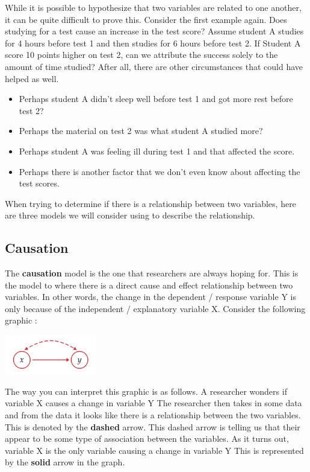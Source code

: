\documentclass[
  letterpaper,
  DIV=11,
  numbers=noendperiod]{scrreprt}
\providecommand{\tightlist}{%
  \setlength{\itemsep}{0pt}\setlength{\parskip}{0pt}}\usepackage{longtable,booktabs,array}
\begin{document}
While it is possible to hypothesize that two variables are related to
one another, it can be quite difficult to prove this. Consider the first
example again. Does studying for a test cause an increase in the test
score? Assume student A studies for 4 hours before test 1 and then
studies for 6 hours before test 2. If Student A score 10 points higher
on test 2, can we attribute the success solely to the amount of time
studied? After all, there are other circumstances that could have helped
as well.

\begin{itemize}
\tightlist
\item
  Perhaps student A didn't sleep well before test 1 and got more rest
  before test 2?
\item
  Perhaps the material on test 2 was what student A studied more?
\item
  Perhaps student A was feeling ill during test 1 and that affected the
  score.
\item
  Perhaps there is another factor that we don't even know about
  affecting the test scores.
\end{itemize}

When trying to determine if there is a relationship between two
variables, here are three models we will consider using to describe the
relationship.

\subsection*{Causation}\label{causation}

The \textbf{causation} model is the one that researchers are always
hoping for. This is the model to where there is a direct cause and
effect relationship between two variables. In other words, the change in
the dependent / response variable Y is only because of the independent /
explanatory variable X. Consider the following graphic :

\includegraphics[width=0.3\textwidth,height=\textheight]{./images/IDV_1.jpg}

The way you can interpret this graphic is as follows. A researcher
wonders if variable X causes a change in variable Y The researcher then
takes in some data and from the data it looks like there is a
relationship between the two variables. This is denoted by the
\textbf{dashed} arrow. This dashed arrow is telling us that their appear
to be some type of association between the variables. As it turns out,
variable X is the only variable causing a change in variable Y This is
represented by the \textbf{solid} arrow in the graph.
\end{document}

